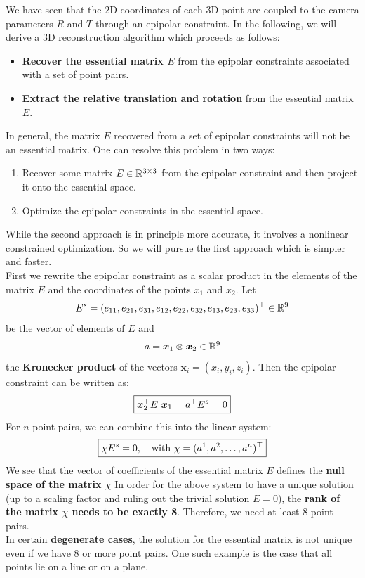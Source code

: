 We have seen that the 2D-coordinates of each 3D point
are coupled to the camera parameters $R$ and $T$ through an epipolar constraint.
In the following, we will derive a 3D reconstruction algorithm
which proceeds as follows:
\begin{itemize}
	\item \textbf{Recover the essential matrix $E$} from the epipolar
		constraints associated with a set of point pairs.
	\item \textbf{Extract the relative translation and rotation}
		from the essential matrix $E$.
\end{itemize}
In general, the matrix $E$ recovered from a set of epipolar constraints
will not be an essential matrix. One can resolve this problem in two ways:
\begin{enumerate}
	\item Recover some matrix $E \in \mathbb{R}^{3 \times{} 3}$ from the epipolar constraint
		and then project it onto the essential space.
	\item Optimize the epipolar constraints in the essential space.
\end{enumerate}
While the second approach is in principle more accurate,
it involves a nonlinear constrained optimization.
So we will pursue the first approach which is simpler and faster.\\

First we rewrite the epipolar constraint as a scalar product
in the elements of the matrix $E$ and the coordinates
of the points $x_1$ and $x_2$. Let
\[
	E^s = (e_{11}, e_{21}, e_{31}, e_{12}, e_{22}, e_{32}, e_{13}, e_{23}, e_{33})^{\top}
		\in \mathbb{R}^9
\]
be the vector of elements of $E$ and
\[
	a = \bm{x}_1 \otimes \bm{x}_2 \in \mathbb{R}^9
\]
the \textbf{Kronecker product} of the vectors $\bm{x}_i = (x_i, y_i, z_i)$.
Then the epipolar constraint can be written as:
\[
	\boxed{ \bm{x}_2^{\top} E\ \bm{x}_1 = a^{\top} E^s = 0 }
\]
For $n$ point pairs, we can combine this into the linear system:
\[
	\boxed{ \chi E^s = 0,\quad \text{with}\ \chi = (a^1, a^2, \ldots, a^n)^{\top} }
\]
We see that the vector of coefficients of the essential matrix $E$
defines the \textbf{null space of the matrix $\chi$}
In order for the above system to have a unique solution
(up to a scaling factor and ruling out the trivial solution $E = 0$),
the \textbf{rank of the matrix $\chi$ needs to be exactly 8}.
Therefore, we need at least 8 point pairs.\\

In certain \textbf{degenerate cases}, the solution for the essential matrix
is not unique even if we have 8 or more point pairs.
One such example is the case that all points lie on a line or on a plane.\\

